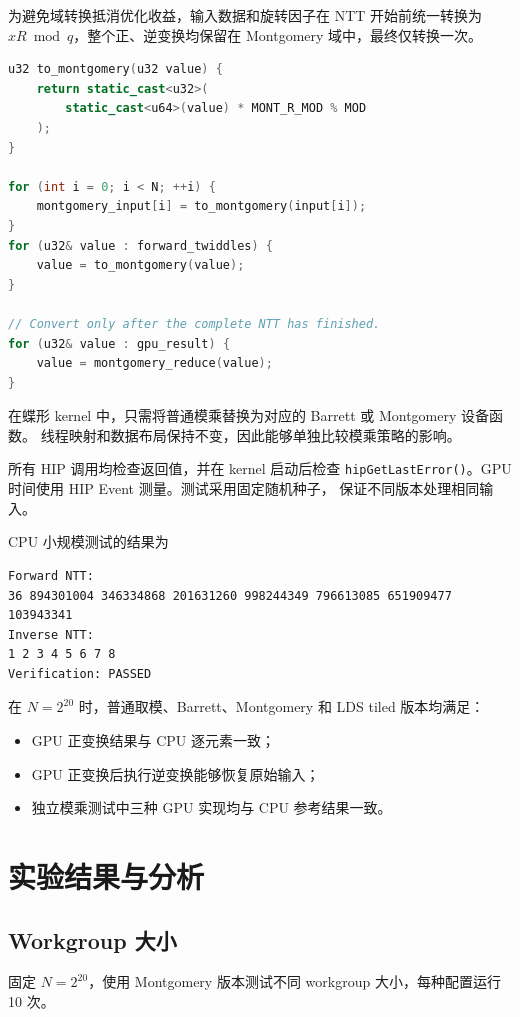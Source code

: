 ﻿\documentclass[a4paper]{article}
\begin{document}
为避免域转换抵消优化收益，输入数据和旋转因子在 NTT 开始前统一转换为
$xR\bmod q$，整个正、逆变换均保留在 Montgomery 域中，最终仅转换一次。

\begin{lstlisting}[language=C++,caption={Montgomery 域的批量预转换与最终转换}]
u32 to_montgomery(u32 value) {
    return static_cast<u32>(
        static_cast<u64>(value) * MONT_R_MOD % MOD
    );
}

for (int i = 0; i < N; ++i) {
    montgomery_input[i] = to_montgomery(input[i]);
}
for (u32& value : forward_twiddles) {
    value = to_montgomery(value);
}

// Convert only after the complete NTT has finished.
for (u32& value : gpu_result) {
    value = montgomery_reduce(value);
}
\end{lstlisting}

在蝶形 kernel 中，只需将普通模乘替换为对应的 Barrett 或 Montgomery 设备函数。
线程映射和数据布局保持不变，因此能够单独比较模乘策略的影响。

所有 HIP 调用均检查返回值，并在 kernel 启动后检查
\texttt{hipGetLastError()}。GPU 时间使用 HIP Event 测量。测试采用固定随机种子，
保证不同版本处理相同输入。

CPU 小规模测试的结果为
\begin{verbatim}
Forward NTT:
36 894301004 346334868 201631260 998244349 796613085 651909477 103943341
Inverse NTT:
1 2 3 4 5 6 7 8
Verification: PASSED
\end{verbatim}

在 $N=2^{20}$ 时，普通取模、Barrett、Montgomery 和 LDS tiled 版本均满足：
\begin{itemize}
  \item GPU 正变换结果与 CPU 逐元素一致；
  \item GPU 正变换后执行逆变换能够恢复原始输入；
  \item 独立模乘测试中三种 GPU 实现均与 CPU 参考结果一致。
\end{itemize}

\section{实验结果与分析}

\subsection{Workgroup 大小}

固定 $N=2^{20}$，使用 Montgomery 版本测试不同 workgroup 大小，每种配置运行
10 次。
\end{document}
